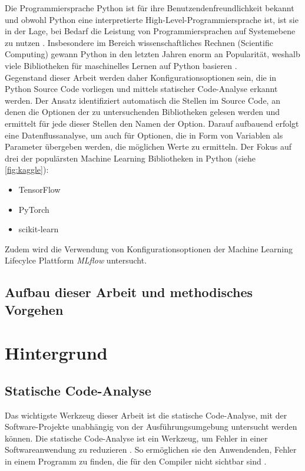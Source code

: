 \documentclass[german,bachelor]{swsLeipzig}
\begin{document}
Die Programmiersprache Python ist für ihre Benutzendenfreundlichkeit bekannt und obwohl Python eine interpretierte High-Level-Programmiersprache ist,
ist sie in der Lage, bei Bedarf die Leistung von Programmiersprachen auf Systemebene zu nutzen \cite[S. 2]{2020}.
Insbesondere im Bereich wissenschaftliches Rechnen (Scientific Computing) gewann Python in den letzten Jahren enorm an Popularität,
weshalb viele Bibliotheken für maschinelles Lernen auf Python basieren \cite[S. 2]{2020}. \\

Gegenstand dieser Arbeit werden daher Konfigurationsoptionen sein, die in Python Source Code vorliegen und mittels statischer Code-Analyse erkannt werden.
Der Ansatz identifiziert automatisch die Stellen im Source Code, an denen die Optionen der zu untersuchenden Bibliotheken gelesen werden
und ermittelt für jede dieser Stellen den Namen der Option.
Darauf aufbauend erfolgt eine Datenflussanalyse, um auch für Optionen, die in Form von Variablen als Parameter übergeben werden,
die möglichen Werte zu ermitteln.
Der Fokus auf drei der populärsten Machine Learning Bibliotheken in Python (siehe \autoref{fig:kaggle}):
\begin{itemize}
 \item TensorFlow
 \item PyTorch
 \item scikit-learn
\end{itemize}
Zudem wird die Verwendung von Konfigurationsoptionen der Machine Learning Lifecylce Plattform \textit{MLflow} untersucht. \\


\section{Aufbau dieser Arbeit und methodisches Vorgehen}

\chapter{Hintergrund}\label{Hintergrund}

\section{Statische Code-Analyse}
Das wichtigste Werkzeug dieser Arbeit ist die statische Code-Analyse,
mit der Software-Projekte unabhängig von der Ausführungsumgebung untersucht werden können.
Die statische Code-Analyse ist ein Werkzeug, um Fehler in einer Softwareanwendung zu reduzieren \cite[S. 99]{bardas2010static}.
So ermöglichen sie den Anwendenden, Fehler in einem Programm zu finden, die für den Compiler nicht sichtbar sind \cite[S. 99]{bardas2010static}.\\
\end{document}

